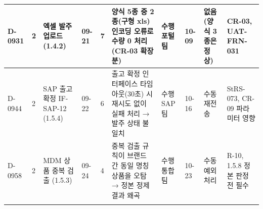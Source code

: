 \documentclass[10pt,a4paper]{article}
\begin{document}
{\begin{tabularx}{\linewidth}{|L{14mm}|C{6mm}|L{30mm}|L{12mm}|C{9mm}|Y|L{30mm}|L{12mm}|L{22mm}|L{34mm}|}
D-0931 & 2 & 엑셀 발주 업로드 (1.4.2) & 09-21 & 7 & 양식 5종 중 2종(구형 xls) 인코딩 오류로 수량 0 처리 (CR-03 확장분) & 수행 포털팀 & 10-09 & 없음 (양식 3종은 정상) & CR-03, UAT-FRN-031 \\ \hline
D-0944 & 2 & SAP 출고 확정 IF-SAP-12 (1.5.4) & 09-22 & 6 & 출고 확정 인터페이스 타임아웃(30초) 시 재시도 없이 실패 처리 → 발주 상태 불일치 & 수행 SAP팀 & 10-16 & 수동 재전송 & StRS-073, CR-09 파라미터 영향 \\ \hline
D-0958 & 2 & MDM 상품 중복 검출 (1.5.3) & 09-24 & 4 & 중복 검출 규칙이 브랜드 간 동일 명칭 상품을 오탐 → 정본 정제 결과 왜곡 & 수행 통합팀 & 10-23 & 수동 예외 처리 & R-10, 1.5.8 정본 판정 전 필수 \\ \hline
\fi
\end{tabularx}}
\end{document}
